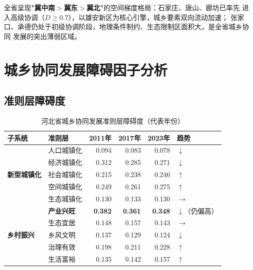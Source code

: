 \documentclass[12pt, a4paper, twoside]{ctexart}
\begin{document}
全省呈现\textbf{"冀中南$>$冀东$>$冀北"}的空间梯度格局：石家庄、唐山、廊坊已率先
进入高级协调（$D\geq0.7$），以雄安新区为核心引擎，城乡要素双向流动加速；
张家口、承德仍处于初级协调阶段，地理条件制约、生态限制区面积大，是全省城乡协同
发展的突出薄弱区域。

\section{城乡协同发展障碍因子分析}

\subsection{准则层障碍度}

\begin{table}[H]
  \centering
  \caption{河北省城乡协同发展准则层障碍度（代表年份）}
  \label{tab:barrier}
  \begin{tabularx}{\linewidth}{l l
      r r r
      >{\centering\arraybackslash}X}
    \toprule
    \rowcolor{TableHead}
    \color{white}\bfseries 子系统 &
    \color{white}\bfseries 准则层 &
    \color{white}\bfseries 2011年 &
    \color{white}\bfseries 2017年 &
    \color{white}\bfseries 2023年 &
    \color{white}\bfseries 趋势 \\
    \midrule
    \multirow{5}{*}{\bfseries 新型城镇化}
    & 人口城镇化 & 0.094 & 0.083 & 0.078 & $\downarrow$ \\
    \cmidrule{2-6}
    & 经济城镇化 & 0.312 & 0.285 & 0.271 & $\downarrow$ \\
    \cmidrule{2-6}
    & 社会城镇化 & 0.215 & 0.238 & 0.246 & $\uparrow$ \\
    \cmidrule{2-6}
    & 空间城镇化 & 0.249 & 0.261 & 0.275 & $\uparrow$ \\
    \cmidrule{2-6}
    & 生态城镇化 & 0.130 & 0.133 & 0.130 & $\rightarrow$ \\
    \midrule
    \multirow{5}{*}{\bfseries 乡村振兴}
    & \cellcolor{AccentRed!10}\bfseries 产业兴旺 &
      \cellcolor{AccentRed!10}\bfseries 0.382 &
      \cellcolor{AccentRed!10}\bfseries 0.361 &
      \cellcolor{AccentRed!10}\bfseries 0.348 &
      \cellcolor{AccentRed!10}$\downarrow$（仍偏高）\\
    \cmidrule{2-6}
    & 生态宜居 & 0.148 & 0.157 & 0.143 & $\rightarrow$ \\
    \cmidrule{2-6}
    & 乡风文明 & 0.137 & 0.129 & 0.124 & $\downarrow$ \\
    \cmidrule{2-6}
    & 治理有效 & 0.198 & 0.211 & 0.228 & $\uparrow$ \\
    \cmidrule{2-6}
    & 生活富裕 & 0.135 & 0.142 & 0.157 & $\uparrow$ \\
    \bottomrule
  \end{tabularx}
\end{table}
\end{document}
